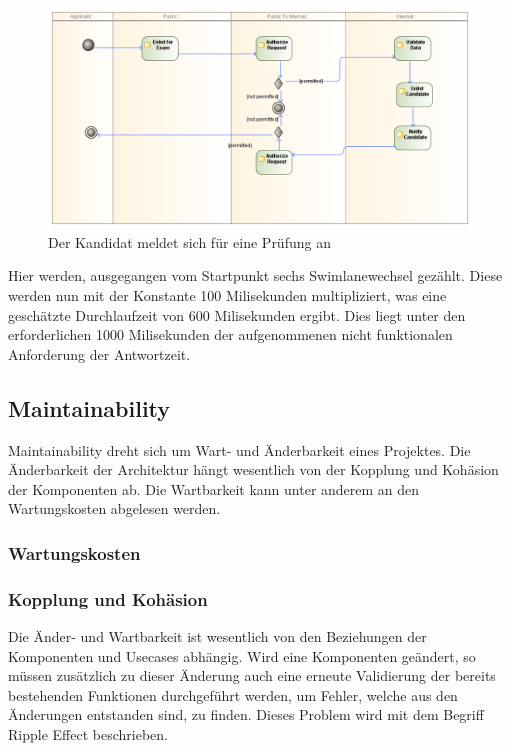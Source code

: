 \begin{figure}[H]
    \centering
    \includegraphics[scale=0.4]{uml/applycomplicated.png}
    \caption{Der Kandidat meldet sich für eine Prüfung an}
    \label{fig:applycomplicated}
\end{figure}

Hier werden, ausgegangen vom Startpunkt sechs Swimlanewechsel gezählt. Diese werden nun mit der Konstante 100 Milisekunden multipliziert, was eine geschätzte Durchlaufzeit von 600 Milisekunden ergibt. Dies liegt unter den erforderlichen 1000 Milisekunden der aufgenommenen nicht funktionalen Anforderung der Antwortzeit.

\subsection{Maintainability}
Maintainability dreht sich um Wart- und Änderbarkeit eines Projektes. Die Änderbarkeit der Architektur hängt wesentlich von der Kopplung und Kohäsion der Komponenten ab. Die Wartbarkeit kann unter anderem an den Wartungskosten abgelesen werden.


\subsubsection{Wartungskosten}


\subsubsection{Kopplung und Kohäsion}
Die Änder- und Wartbarkeit ist wesentlich von den Beziehungen der Komponenten und Usecases abhängig. Wird eine Komponenten geändert, so müssen zusätzlich zu dieser Änderung auch eine erneute Validierung der bereits bestehenden Funktionen durchgeführt werden, um Fehler, welche aus den Änderungen entstanden sind, zu finden. Dieses Problem wird mit dem Begriff Ripple Effect beschrieben. \cite[S. 3]{ripple}

